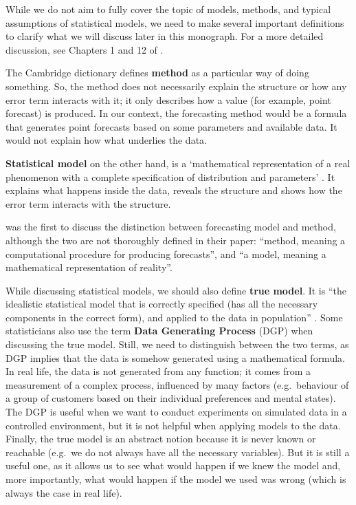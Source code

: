 \documentclass[]{book}
\theoremstyle{definition}
\theoremstyle{definition}
\theoremstyle{definition}
\theoremstyle{definition}
\theoremstyle{remark}
\begin{document}
While we do not aim to fully cover the topic of models, methods, and typical assumptions of statistical models, we need to make several important definitions to clarify what we will discuss later in this monograph. For a more detailed discussion, see Chapters 1 and 12 of \citet{SvetunkovSBA}.

The Cambridge dictionary \citep{CambridgeMethod} defines \textbf{method} as a particular way of doing something. So, the method does not necessarily explain the structure or how any error term interacts with it; it only describes how a value (for example, point forecast) is produced. In our context, the forecasting method would be a formula that generates point forecasts based on some parameters and available data. It would not explain how what underlies the data.

\textbf{Statistical model} on the other hand, is a `mathematical representation of a real phenomenon with a complete specification of distribution and parameters' \citep{Svetunkov2019a}. It explains what happens inside the data, reveals the structure and shows how the error term interacts with the structure.

\citet{Chatfield2001} was the first to discuss the distinction between forecasting model and method, although the two are not thoroughly defined in their paper: ``method, meaning a computational procedure for producing forecasts'', and ``a model, meaning a mathematical representation of reality''.

While discussing statistical models, we should also define \textbf{true model}. It is ``the idealistic statistical model that is correctly specified (has all the necessary components in the correct form), and applied to the data in population'' \citep{SvetunkovSBA}. Some statisticians also use the term \textbf{Data Generating Process} (DGP) when discussing the true model. Still, we need to distinguish between the two terms, as DGP implies that the data is somehow generated using a mathematical formula. In real life, the data is not generated from any function; it comes from a measurement of a complex process, influenced by many factors (e.g.~behaviour of a group of customers based on their individual preferences and mental states). The DGP is useful when we want to conduct experiments on simulated data in a controlled environment, but it is not helpful when applying models to the data. Finally, the true model is an abstract notion because it is never known or reachable (e.g.~we do not always have all the necessary variables). But it is still a useful one, as it allows us to see what would happen if we knew the model and, more importantly, what would happen if the model we used was wrong (which is always the case in real life).
\end{document}

